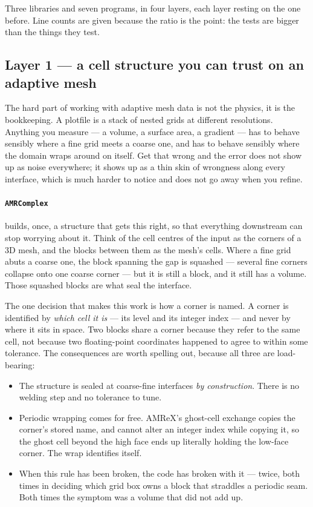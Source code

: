 \documentclass[11pt]{article}
\begin{document}
Three libraries and seven programs, in four layers, each layer resting on the
one before. Line counts are given because the ratio is the point: the tests are
bigger than the things they test.

\subsection{Layer 1 --- a cell structure you can trust on an adaptive mesh}

The hard part of working with adaptive mesh data is not the physics, it is the
bookkeeping. A plotfile is a stack of nested grids at different resolutions.
Anything you measure --- a volume, a surface area, a gradient --- has to behave
sensibly where a fine grid meets a coarse one, and has to behave sensibly where
the domain wraps around on itself. Get that wrong and the error does not show
up as noise everywhere; it shows up as a thin skin of wrongness along every
interface, which is much harder to notice and does not go away when you refine.

\paragraph{\texttt{AMRComplex}} builds, once, a structure that gets this right,
so that everything downstream can stop worrying about it. Think of the cell
centres of the input as the corners of a 3D mesh, and the blocks between them
as the mesh's cells. Where a fine grid abuts a coarse one, the block spanning
the gap is squashed --- several fine corners collapse onto one coarse corner
--- but it is still a block, and it still has a volume. Those squashed blocks
are what seal the interface.

The one decision that makes this work is how a corner is named. A corner is
identified by \emph{which cell it is} --- its level and its integer index ---
and never by where it sits in space. Two blocks share a corner because they
refer to the same cell, not because two floating-point coordinates happened to
agree to within some tolerance. The consequences are worth spelling out,
because all three are load-bearing:

\begin{itemize}
\item The structure is sealed at coarse-fine interfaces \emph{by construction}.
      There is no welding step and no tolerance to tune.
\item Periodic wrapping comes for free. AMReX's ghost-cell exchange copies the
      corner's stored name, and cannot alter an integer index while copying it,
      so the ghost cell beyond the high face ends up literally holding the
      low-face corner. The wrap identifies itself.
\item When this rule has been broken, the code has broken with it --- twice,
      both times in deciding which grid box owns a block that straddles a
      periodic seam. Both times the symptom was a volume that did not add up.
\end{itemize}
\end{document}
